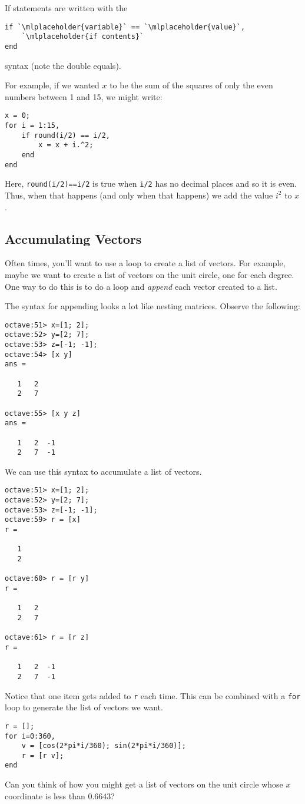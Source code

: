 \documentclass[letter]{article}
\begin{document}
	If statements are written with the 
\begin{lstlisting}[style=Matlab-Pyglike,escapechar=`]
if `\mlplaceholder{variable}` == `\mlplaceholder{value}`,
    `\mlplaceholder{if contents}`
end
\end{lstlisting}
	syntax (note the double equals). 

	For example, if we wanted $x$ to be the sum of the squares of only the even numbers between 1 and 15, we might write:
\begin{lstlisting}[style=Matlab-Pyglike,escapechar=`]
x = 0;
for i = 1:15,
    if round(i/2) == i/2,
        x = x + i.^2;
    end
end
\end{lstlisting}

	Here, {\tt round(i/2)==i/2} is true when {\tt i/2} has no decimal places and so it is even.  Thus, when that happens
	(and only when that happens) we add the value $i^2$ to $x$.

	\subsection{Accumulating Vectors}
	Often times, you'll want to use a loop to create a list of vectors.  For example,
	maybe we want to create a list of vectors on the unit circle, one for each degree.
	One way to do this is to do a loop and \emph{append} each vector created to a list.

	The syntax for appending looks a lot like nesting matrices.  Observe the following:
	\begin{lstlisting}[style=Matlab-Pyglike,escapechar=`]
octave:51> x=[1; 2];
octave:52> y=[2; 7];
octave:53> z=[-1; -1];
octave:54> [x y]
ans =

   1   2
   2   7

octave:55> [x y z]
ans =

   1   2  -1
   2   7  -1
	\end{lstlisting}
	We can use this syntax to accumulate a list of vectors.
	\begin{lstlisting}[style=Matlab-Pyglike,escapechar=`]
octave:51> x=[1; 2];
octave:52> y=[2; 7];
octave:53> z=[-1; -1];
octave:59> r = [x]
r =

   1
   2

octave:60> r = [r y]
r =

   1   2
   2   7

octave:61> r = [r z]
r =

   1   2  -1
   2   7  -1
	\end{lstlisting}
	Notice that one item gets added to {\tt r} each time.  This can be combined with a {\tt for}
	loop to generate the list of vectors we want.
	\begin{lstlisting}[style=Matlab-Pyglike,escapechar=`]
r = [];
for i=0:360,
    v = [cos(2*pi*i/360); sin(2*pi*i/360)];
    r = [r v];
end
	\end{lstlisting}
	Can you think of how you might get a list of vectors on the unit circle whose $x$ coordinate is less than $0.6643$?
\end{document}
